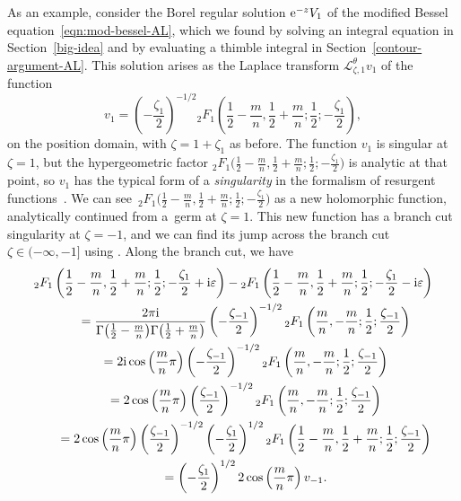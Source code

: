 \documentclass[10pt,a4paper]{amsart}
\newcommand{\laplace}{\mathcal{L}}
\numberwithin{equation}{section}
\begin{document}
As an example, consider the Borel regular solution ${\rm e}^{-z} V_1$ of the modified Bessel equation~\eqref{eqn:mod-bessel-AL}, which we found by solving an integral equation in Section~\ref{big-idea} and by evaluating a thimble integral in Section~\ref{contour-argument-AL}. This solution arises as the Laplace transform $\laplace^\theta_{\zeta, 1} v_1$ of the function
\[ v_1 = \left(-\frac{\zeta_1}{2}\right)^{-1/2} {}_2F_1\left(\frac{1}{2}-\frac{m}{n},\frac{1}{2}+\frac{m}{n};\frac{1}{2};-\frac{\zeta_1}{2}\right), \]
on the position domain, with $\zeta=1+\zeta_1$ as before. The function $v_1$ is singular at $\zeta = 1$, but the hypergeometric factor ${}_2F_1\bigl(\frac{1}{2}-\frac{m}{n},\frac{1}{2}+\frac{m}{n};\frac{1}{2};-\frac{\zeta_1}{2}\bigr)$ is analytic at that point, so $v_1$ has the typical form of a {\em singularity} in the formalism of resurgent functions~\cite[Section~2]{sauzin2021variations}. We can see~${{}_2F_1\bigl(\frac{1}{2}-\frac{m}{n},\frac{1}{2}+\frac{m}{n};\frac{1}{2};-\frac{\zeta_1}{2}\bigr)}$ as a new holomorphic function, analytically continued from a~germ at $\zeta = 1$. This new function has a branch cut singularity at $\zeta=-1$, and we can find its jump across the branch cut $\zeta \in (-\infty, -1]$ using \cite[equation~(15.2.3)]{dlmf}. Along the branch cut, we have
\begin{gather*}
{}_2F_1\left(\frac{1}{2}-\frac{m}{n},\frac{1}{2}+\frac{m}{n};\frac{1}{2};-\frac{\zeta_1}{2}+{\rm i}\varepsilon\right)-{}_2F_1\left(\frac{1}{2}-\frac{m}{n},\frac{1}{2}+\frac{m}{n};\frac{1}{2};-\frac{\zeta_1}{2}-{\rm i}\varepsilon\right) \\
\qquad=\frac{2 \pi {\rm i}}{\Gamma\bigl(\frac{1}{2}-\frac{m}{n}\bigr)\Gamma\bigl(\frac{1}{2}+\frac{m}{n}\bigr)} \left(-\frac{\zeta_{-1}}{2}\right)^{-1/2} {}_2F_1\left(\frac{m}{n},-\frac{m}{n};\frac{1}{2};\frac{\zeta_{-1}}{2}\right) \\
\qquad=2{\rm i}\cos\left(\frac{m}{n}\pi\right) \left(-\frac{\zeta_{-1}}{2}\right)^{-1/2} {}_2F_1\left(\frac{m}{n},-\frac{m}{n};\frac{1}{2};\frac{\zeta_{-1}}{2}\right) \\
\qquad=2\cos\left(\frac{m}{n}\pi\right) \left(\frac{\zeta_{-1}}{2}\right)^{-1/2} {}_2F_1\left(\frac{m}{n},-\frac{m}{n};\frac{1}{2};\frac{\zeta_{-1}}{2}\right) \\
\qquad=2\cos\left(\frac{m}{n}\pi\right) \left(\frac{\zeta_{-1}}{2}\right)^{-1/2} \left(-\frac{\zeta_{1}}{2}\right)^{1/2} {}_2F_1\left(\frac{1}{2}-\frac{m}{n},\frac{1}{2}+\frac{m}{n};\frac{1}{2};\frac{\zeta_{-1}}{2}\right) \\
\qquad=\left(-\frac{\zeta_{1}}{2}\right)^{1/2} 2\cos\left(\frac{m}{n}\pi\right) v_{-1}.
\end{gather*}
\end{document}
